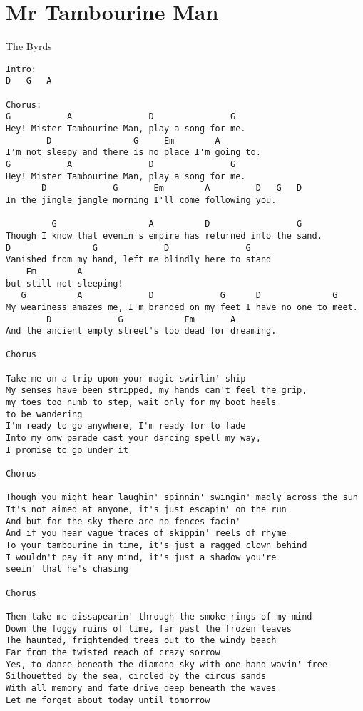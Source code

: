 \section{Mr Tambourine Man} \label{sec:song5}
The Byrds
\begin{verbatim}
Intro:
D   G   A

Chorus:
G           A               D               G
Hey! Mister Tambourine Man, play a song for me.
        D                G     Em        A
I'm not sleepy and there is no place I'm going to.
G           A               D               G
Hey! Mister Tambourine Man, play a song for me.
       D             G       Em        A         D   G   D
In the jingle jangle morning I'll come following you.

         G                  A          D                 G
Though I know that evenin's empire has returned into the sand.
D                G             D               G
Vanished from my hand, left me blindly here to stand 
    Em        A
but still not sleeping!
   G          A             D             G      D              G
My weariness amazes me, I'm branded on my feet I have no one to meet.
        D             G            Em       A
And the ancient empty street's too dead for dreaming.

Chorus

Take me on a trip upon your magic swirlin' ship
My senses have been stripped, my hands can't feel the grip, 
my toes too numb to step, wait only for my boot heels
to be wandering
I'm ready to go anywhere, I'm ready for to fade
Into my onw parade cast your dancing spell my way,
I promise to go under it

Chorus

Though you might hear laughin' spinnin' swingin' madly across the sun
It's not aimed at anyone, it's just escapin' on the run
And but for the sky there are no fences facin'
And if you hear vague traces of skippin' reels of rhyme
To your tambourine in time, it's just a ragged clown behind
I wouldn't pay it any mind, it's just a shadow you're
seein' that he's chasing

Chorus

Then take me dissapearin' through the smoke rings of my mind
Down the foggy ruins of time, far past the frozen leaves
The haunted, frightended trees out to the windy beach
Far from the twisted reach of crazy sorrow
Yes, to dance beneath the diamond sky with one hand wavin' free
Silhouetted by the sea, circled by the circus sands
With all memory and fate drive deep beneath the waves
Let me forget about today until tomorrow
\end{verbatim}
